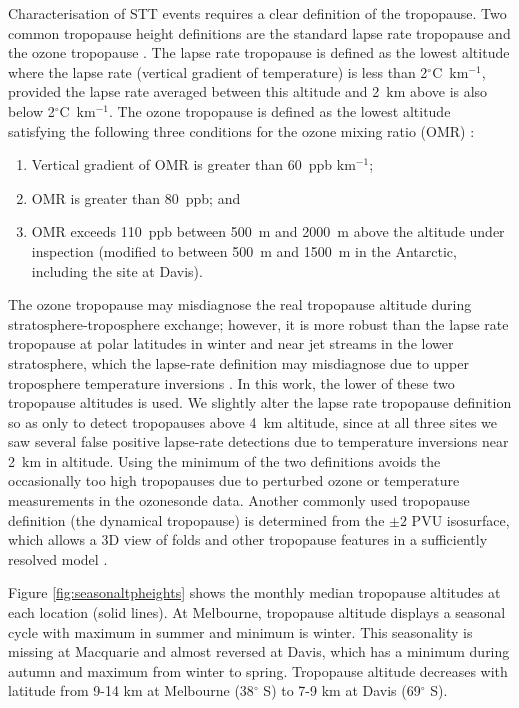 \documentclass[acp, manuscript]{copernicus} %
\begin{document}
    Characterisation of STT events requires a clear definition of the tropopause.
    Two common tropopause height definitions are the standard lapse rate tropopause \citep{WMO1957} and the ozone tropopause \citep{Bethan1996}.
    The lapse rate tropopause is defined as the lowest altitude where the lapse rate (vertical gradient of temperature) is less than 2$^\circ$C~km$^{-1}$, provided the lapse rate averaged between this altitude and 2~km above is also below 2$^\circ$C~km$^{-1}$.
    The ozone tropopause is defined as the lowest altitude satisfying the following three conditions for the ozone mixing ratio (OMR) \citep{Bethan1996}:
    \begin{enumerate}
      \item Vertical gradient of OMR is greater than 60~ppb km$^{-1}$;
      \item OMR is greater than 80~ppb; and
      \item OMR exceeds 110~ppb between 500~m and 2000~m above the altitude under inspection (modified to between 500~m and 1500~m in the Antarctic, including the site at Davis).
    \end{enumerate}
    The ozone tropopause may misdiagnose the real tropopause altitude during stratosphere-troposphere exchange; however, it is more robust than the lapse rate tropopause at polar latitudes in winter and near jet streams in the lower stratosphere, which the lapse-rate definition may misdiagnose due to upper troposphere temperature inversions \citep{Bethan1996, Tomikawa2009, Alexander2013}.
    In this work, the lower of these two tropopause altitudes is used.
    We slightly alter the lapse rate tropopause definition so as only to detect tropopauses above 4~km altitude, since at all three sites we saw several false positive lapse-rate detections due to temperature inversions near 2~km in altitude.
    Using the minimum of the two definitions avoids the occasionally too high tropopauses due to perturbed ozone or temperature measurements in the ozonesonde data.
    Another commonly used tropopause definition (the dynamical tropopause) is determined from the $\pm 2$ PVU isosurface, which allows a 3D view of folds and other tropopause features in a sufficiently resolved model \citep{Skerlak2014}.
    
    Figure \ref{fig:seasonaltpheights} shows the monthly median tropopause altitudes at each location (solid lines).
    At Melbourne, tropopause altitude displays a seasonal cycle with maximum in summer and minimum is winter.
    This seasonality is missing at Macquarie and almost reversed at Davis, which has a minimum during autumn and maximum from winter to spring.
    Tropopause altitude decreases with latitude from 9-14 km at Melbourne (38$^\circ$ S) to 7-9 km at Davis (69$^\circ$ S).
\end{document}
